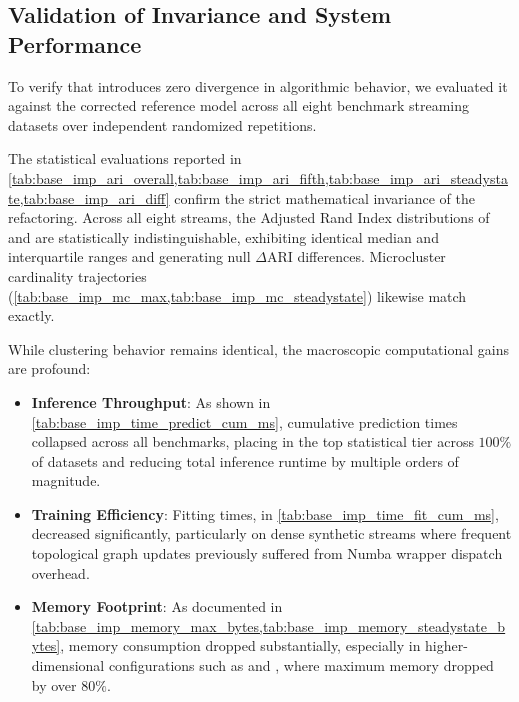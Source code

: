 

\subsection{Validation of Invariance and System Performance}

To verify that  introduces zero divergence in algorithmic behavior, we evaluated it against the corrected reference model across all eight benchmark streaming datasets over independent randomized repetitions.












The statistical evaluations reported in \cref{tab:base_imp_ari_overall,tab:base_imp_ari_fifth,tab:base_imp_ari_steadystate,tab:base_imp_ari_diff} confirm the strict mathematical invariance of the refactoring. Across all eight streams, the Adjusted Rand Index distributions of  and  are statistically indistinguishable, exhibiting identical median and interquartile ranges and generating null $\Delta\text{ARI}$ differences. Microcluster cardinality trajectories (\cref{tab:base_imp_mc_max,tab:base_imp_mc_steadystate}) likewise match exactly.

While clustering behavior remains identical, the macroscopic computational gains are profound:
\begin{itemize}
    \item \textbf{Inference Throughput}: As shown in \cref{tab:base_imp_time_predict_cum_ms}, cumulative prediction times collapsed across all benchmarks, placing  in the top statistical tier across $100\%$ of datasets and reducing total inference runtime by multiple orders of magnitude.
    \item \textbf{Training Efficiency}: Fitting times, in \cref{tab:base_imp_time_fit_cum_ms}, decreased significantly, particularly on dense synthetic streams where frequent topological graph updates previously suffered from Numba wrapper dispatch overhead.
    \item \textbf{Memory Footprint}: As documented in \cref{tab:base_imp_memory_max_bytes,tab:base_imp_memory_steadystate_bytes}, memory consumption dropped substantially, especially in higher-dimensional configurations such as  and , where maximum memory dropped by over $80\%$.
\end{itemize}

